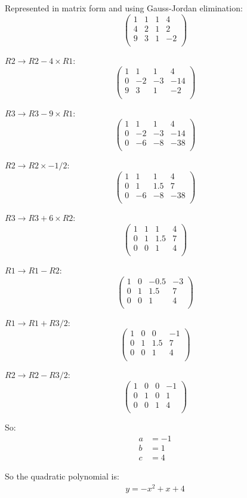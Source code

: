 \documentclass[12pt,a4paper]{report}
\begin{document}
Represented in matrix form and using Gauss-Jordan elimination:
 \[
 \left(\begin{array}{rrr|r}
   1 & 1 & 1 & 4 \\
   4 & 2 & 1 & 2  \\
   9 & 3 & 1 & -2  \\ 
   \end{array} \right)
\]

\( R2 \rightarrow R2 - 4 \times R1\):
 \[
 \left(\begin{array}{rrr|r}
   1 & 1  & 1  & 4 \\
   0 & -2 & -3 & -14  \\
   9 & 3  & 1  & -2  \\ 
   \end{array} \right)
\]

\( R3 \rightarrow R3 - 9 \times R1 \):
 \[
 \left(\begin{array}{rrr|r}
   1 & 1  & 1  & 4 \\
   0 & -2 & -3 & -14  \\
   0 & -6 & -8 & -38  \\ 
   \end{array} \right)
\]

\( R2 \rightarrow R2 \times -1/2\):
 \[
 \left(\begin{array}{rrr|r}
   1 & 1  & 1  & 4 \\
   0 & 1 & 1.5 & 7  \\
   0 & -6 & -8 & -38  \\ 
   \end{array} \right)
\]

\( R3 \rightarrow R3 + 6 \times R2\):
 \[
 \left(\begin{array}{rrr|r}
   1 & 1  & 1  & 4 \\
   0 & 1 & 1.5 & 7  \\
   0 & 0 & 1 & 4  \\ 
   \end{array} \right)
\]

\( R1 \rightarrow R1 - R2\):
 \[
 \left(\begin{array}{rrr|r}
   1 & 0 & -0.5 & -3 \\
   0 & 1 & 1.5 & 7  \\
   0 & 0 & 1 & 4  \\ 
   \end{array} \right)
\]

\( R1 \rightarrow R1 + R3/2\):
 \[
 \left(\begin{array}{rrr|r}
   1 & 0 & 0 & -1 \\
   0 & 1 & 1.5 & 7  \\
   0 & 0 & 1 & 4  \\ 
   \end{array} \right)
\]

\( R2 \rightarrow R2 - R3/2\):
 \[
 \left(\begin{array}{rrr|r}
   1 & 0 & 0 & -1 \\
   0 & 1 & 0 & 1  \\
   0 & 0 & 1 & 4  \\ 
   \end{array} \right)
\]

So:
\begin{align*}
a &= -1 \\
b &= 1 \\
c &= 4
\end{align*}

So the quadratic polynomial is:
\begin{align*}
y = -x^2 + x + 4
\end{align*}
\end{document}
